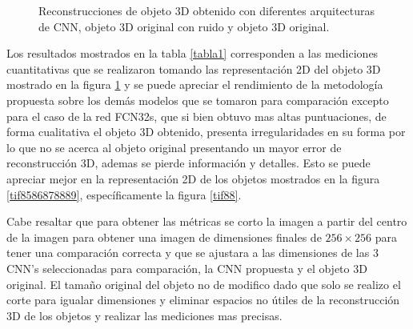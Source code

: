 \documentclass[10pt,letterpaper]{article}
\begin{document}
\begin{figure}[H]
\begin{center}
{            \label{tif102}}        
        \caption{Reconstrucciones de objeto 3D obtenido con diferentes arquitecturas de CNN, objeto 3D original con ruido y objeto 3D original.}
        \label{tif98100102104106}
      \end{center}
\end{figure}

Los resultados mostrados en la tabla \ref{tabla1} corresponden a las mediciones cuantitativas que se realizaron tomando las representación 2D del objeto 3D mostrado en la figura \ref{tif98100102104106} y se puede apreciar el rendimiento de la metodología propuesta sobre los demás modelos que se tomaron para comparación excepto para el caso de la red FCN32s, que si bien obtuvo mas altas puntuaciones, de forma cualitativa el objeto 3D obtenido, presenta irregularidades en su forma por lo que no se acerca al objeto original presentando un mayor error de reconstrucción 3D, ademas se pierde información y detalles. Esto se puede apreciar mejor en la representación 2D de los objetos mostrados en la figura \ref{tif8586878889}, específicamente la figura \ref{tif88}. 

Cabe resaltar que para obtener las métricas se corto la imagen a partir del centro de la imagen para obtener una imagen de dimensiones finales de $256 \times 256$ para tener una comparación correcta y que se ajustara a las dimensiones de las 3 CNN's seleccionadas para comparación, la CNN propuesta y el objeto 3D original. El tamaño original del objeto no de modifico dado que solo se realizo el corte para igualar dimensiones y eliminar espacios no útiles de la reconstrucción 3D de los objetos y realizar las mediciones mas precisas.
 
\end{document}
